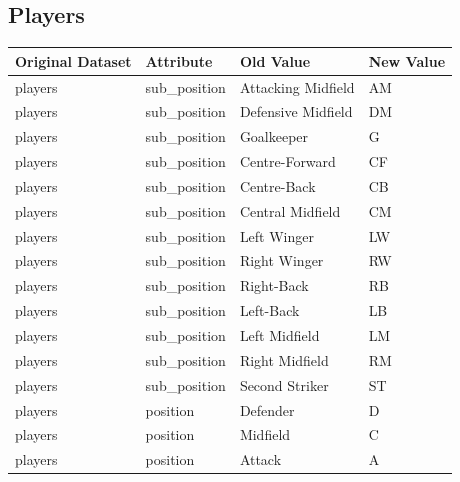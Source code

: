 \documentclass{Configuration_Files/PoliMi3i_thesis}
\begin{document}
\subsection{Players}
\begin{table}[ht]
	\centering
	\begin{tabular}{|l|l|l|l|}
		\hline
		\textbf{Original Dataset} & \textbf{Attribute} & \textbf{Old Value} & \textbf{New Value} \\ \hline
		players                   & sub\_position      & Attacking Midfield & AM                 \\ \hline
		players                   & sub\_position      & Defensive Midfield & DM                 \\ \hline
		players                   & sub\_position      & Goalkeeper         & G                  \\ \hline
		players                   & sub\_position      & Centre-Forward     & CF                 \\ \hline
		players                   & sub\_position      & Centre-Back        & CB                 \\ \hline
		players                   & sub\_position      & Central Midfield   & CM                 \\ \hline
		players                   & sub\_position      & Left Winger        & LW                 \\ \hline
		players                   & sub\_position      & Right Winger       & RW                 \\ \hline
		players                   & sub\_position      & Right-Back         & RB                 \\ \hline
		players                   & sub\_position      & Left-Back          & LB                 \\ \hline
		players                   & sub\_position      & Left Midfield      & LM                 \\ \hline
		players                   & sub\_position      & Right Midfield     & RM                 \\ \hline
		players                   & sub\_position      & Second Striker     & ST                 \\ \hline
		players                   & position           & Defender           & D                  \\ \hline
		players                   & position           & Midfield           & C                  \\ \hline
		players                   & position           & Attack             & A                  \\ \hline

\end{tabular}
\end{table}
\end{document}
